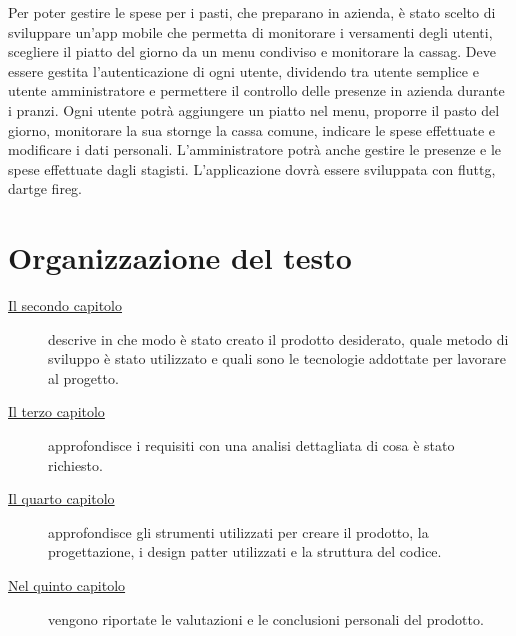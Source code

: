 Per poter gestire le spese per i pasti, che preparano in azienda, è stato scelto di sviluppare un'app mobile che permetta di monitorare i versamenti degli utenti, scegliere il piatto del giorno da un menu condiviso e monitorare la {\gls{cassag}}\glsfirstoccur.\newline
Deve essere gestita l'autenticazione di ogni utente, dividendo tra utente semplice e utente amministratore e permettere il controllo delle presenze in azienda durante i pranzi. \newline
Ogni utente potrà aggiungere un piatto nel menu, proporre il pasto del giorno, monitorare la sua {\gls{storng}}\glsfirstoccur e la cassa comune, indicare le spese effettuate e modificare i dati personali. \newline
L'amministratore potrà anche gestire le presenze e le spese effettuate dagli stagisti.
L'applicazione dovrà essere sviluppata con {\gls{fluttg}}\glsfirstoccur, {\gls{dartg}}\glsfirstoccur e {\gls{fireg}}\glsfirstoccur.

\section{Organizzazione del testo}

\begin{description}
    \item[{\hyperref[cap:processi-metodologie]{Il secondo capitolo}}] descrive in che modo è stato creato il prodotto desiderato, quale metodo di sviluppo è stato utilizzato e quali sono le tecnologie addottate per lavorare al progetto.
    
    
    \item[{\hyperref[cap:analisi-requisiti]{Il terzo capitolo}}] approfondisce i requisiti con una analisi dettagliata di cosa è stato richiesto.
    
    \item[{\hyperref[cap:progettazione-codifica]{Il quarto capitolo}}] approfondisce gli strumenti utilizzati per creare il prodotto, la progettazione, i design patter utilizzati e la struttura del codice.
    
    
    \item[{\hyperref[cap:conclusioni]{Nel quinto capitolo}}] vengono riportate le valutazioni e le conclusioni personali del prodotto.
\end{description}


